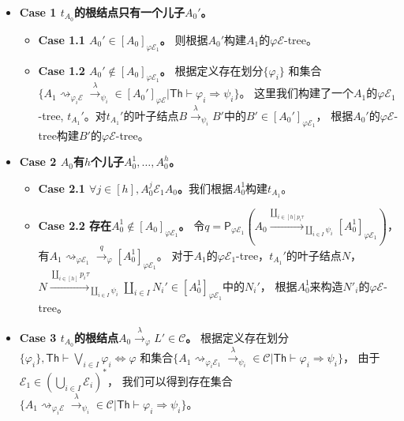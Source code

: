 \begin{itemize}
   \item {
      \textbf{Case 1 $t_{A_0}$的根结点只有一个儿子$A_0'$。}
      \begin{itemize}
         \item {
            \textbf{Case 1.1 $A_0'\in [A_0]_{\varphi\mathcal{E}_1}$。} 则根据$A_0'$构建$A_1$的$\varphi\mathcal{E}$-tree。
         }
         \item {
            \textbf{Case 1.2 $A_0'\notin [A_0]_{\varphi\mathcal{E}_1}$。} 
            根据定义存在划分$\{\varphi_i\}$
            和集合$\{A_1\rightsquigarrow_{\varphi_i\mathcal{E}}\stackrel{\lambda}{\rightarrow}_{\psi_i} \in [A_0']_{\varphi\mathcal{E}}|\mathsf{Th}\vdash \varphi_i\Rightarrow\psi_i\}$。
            这里我们构建了一个$A_1$的$\varphi\mathcal{E}_1$-tree, $t_{A_1}'$。对$t_{A_1}'$的叶子结点$B\stackrel{\lambda}{\rightarrow}_{\psi_i} B'$中的$B'\in[A_0']_{\varphi\mathcal{E}_1}$，
            根据$A_0'$的$\varphi\mathcal{E}$-tree构建$B'$的$\varphi\mathcal{E}$-tree。
         }
      \end{itemize}
   }
   \item {
      \textbf{Case 2 $A_0$有$h$个儿子$A_0^1,\dots, A_0^h$。}
      \begin{itemize}
         \item {
            \textbf{Case 2.1 $\forall j\in [h], A^j_0\mathcal{E}_1 A_0$。}我们根据$A^1_0$构建$t_{A_1}$。
         }
         \item {
            \textbf{Case 2.2 存在$A^1_0\notin[A_0]_{\varphi\mathcal{E}_1}$。}
            令$q = \mathsf{P}_{\varphi\mathcal{E}_1}(A_0\stackrel{\coprod_{i\in [h]p_i\tau}}{\rightarrow}_{\coprod_{i\in I}\psi_i}[A^1_0]_{\varphi\mathcal{E}_1})$，
            有$A_1\rightsquigarrow_{\varphi \mathcal{E}_1}\stackrel{q}{\rightarrow}_{\varphi} [A^1_0]_{\varphi\mathcal{E}_1}$。
            对于$A_1$的$\varphi\mathcal{E}_1$-tree，$t_{A_1}'$的叶子结点$N$，$N\stackrel{\coprod_{i\in [h]}p_i\tau}{\rightarrow}_{\coprod_{i\in I}\psi_i} \coprod_{i\in I}N_i'\in [A^1_0]_{\varphi\mathcal{E}_1}$中的$N_i'$，
            根据$A^1_0$来构造$N'_i$的$\varphi\mathcal{E}$-tree。
         }
      \end{itemize}
   }
   \item {
      \textbf{Case 3 $t_{A_0}$的根结点$A_0\stackrel{\lambda}{\rightarrow}_{\varphi} L'\in \mathcal{C}$。}
      根据定义存在划分$\{\varphi_i\}, \mathsf{Th}\vdash\bigvee_{i\in I}\varphi_i \Leftrightarrow \varphi$
      和集合$\{A_1\rightsquigarrow_{\varphi_i\mathcal{E}_1}\stackrel{\lambda}{\rightarrow}_{\psi_i} \in \mathcal{C}|\mathsf{Th}\vdash \varphi_i\Rightarrow\psi_i\}$，
      由于$\mathcal{E}_1\in (\bigcup_{i\in I}\mathcal{E}_i)^*$， 我们可以得到存在集合$\{A_1\rightsquigarrow_{\varphi_i\mathcal{E}}\stackrel{\lambda}{\rightarrow}_{\psi_i} \in \mathcal{C}|\mathsf{Th}\vdash \varphi_i\Rightarrow\psi_i\}$。
   }
\end{itemize}

